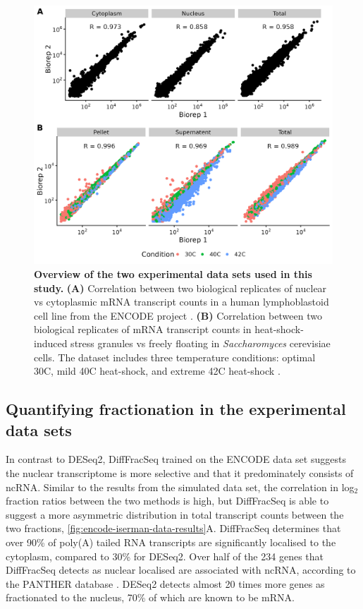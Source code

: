 \documentclass[../main.tex]{subfiles}
\begin{document}
\begin{figure}

{\centering \includegraphics[width=0.95\linewidth]{figures/fractionation_experimental_dataset_summary.png} 

}

\caption[Summary experimental test data sets.]{\textbf{Overview of the two experimental data sets used in this study.} \textbf{(A)} Correlation between two biological replicates of nuclear vs cytoplasmic mRNA transcript counts in a human lymphoblastoid cell line from the ENCODE project \parencite{Dunham2012}. \textbf{(B)} Correlation between two biological replicates of mRNA transcript counts in heat-shock-induced stress granules vs freely floating in \textit{Saccharomyces} cerevisiae cells. The dataset includes three temperature conditions: optimal 30C, mild 40C heat-shock, and extreme 42C heat-shock  \parencite{Iserman2020}.} \label{fig:fractionation-datasets}
\end{figure}

\subsection{Quantifying fractionation in the experimental data sets}

In contrast to DESeq2, DiffFracSeq trained on the ENCODE data set suggests the nuclear transcriptome is more selective and that it predominately consists of ncRNA.
Similar to the results from the simulated data set, the correlation in log$_2$ fraction ratios between the two methods is high, but DiffFracSeq is able to suggest a more asymmetric distribution in total transcript counts between the two fractions, \ref{fig:encode-iserman-data-results}A.
DiffFracSeq determines that over 90\% of poly(A) tailed RNA transcripts are significantly localised to the cytoplasm, compared to 30\% for DESeq2.
Over half of the 234 genes that DiffFracSeq detects as nuclear localised are associated with ncRNA, according to the PANTHER database \parencite{Mi2013}. 
DESeq2 detects almost 20 times more genes as fractionated to the nucleus, 70\% of which are known to be mRNA.
\end{document}
